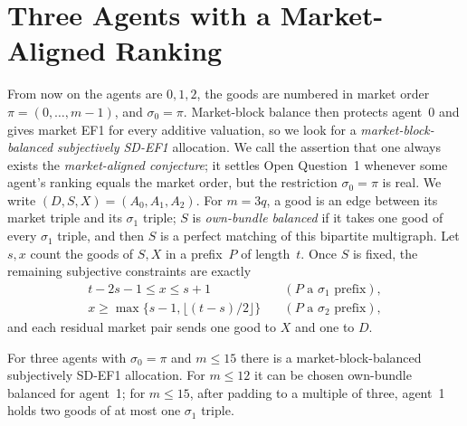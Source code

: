 \documentclass[sigconf,anonymous]{aamas}
\begin{document}
\section{Three Agents with a Market-Aligned Ranking}\label{sec:three}
From now on the agents are $0,1,2$, the goods are numbered in market order $\pi=(0,\dots,m-1)$, and $\sigma_0=\pi$. Market-block balance then protects agent~0 and gives market EF1 for every additive valuation, so we look for a \emph{market-block-balanced subjectively SD-EF1} allocation. We call the assertion that one always exists the \emph{market-aligned conjecture}; it settles Open Question~1 whenever some agent's ranking equals the market order, but the restriction $\sigma_0=\pi$ is real. We write $(D,S,X)=(A_0,A_1,A_2)$. For $m=3q$, a good is an edge between its market triple and its $\sigma_1$ triple; $S$ is \emph{own-bundle balanced} if it takes one good of every $\sigma_1$ triple, and then $S$ is a perfect matching of this bipartite multigraph. Let $s,x$ count the goods of $S,X$ in a prefix~$P$ of length~$t$. Once $S$ is fixed, the remaining subjective constraints are exactly
\begin{align}
 t-2s-1\le x\le s+1 &\quad(P\text{ a }\sigma_1\text{ prefix}),\label{eq:one}\\
 x\ge\max\{s-1,\lfloor(t-s)/2\rfloor\} &\quad(P\text{ a }\sigma_2\text{ prefix}),\label{eq:two}
\end{align}
and each residual market pair sends one good to $X$ and one to $D$.

\begin{theorem}\label{thm:twelve}
For three agents with $\sigma_0=\pi$ and $m\le15$ there is a market-block-balanced subjectively SD-EF1 allocation. For $m\le12$ it can be chosen own-bundle balanced for agent~1; for $m\le15$, after padding to a multiple of three, agent~1 holds two goods of at most one $\sigma_1$ triple.
\end{theorem}
\end{document}
